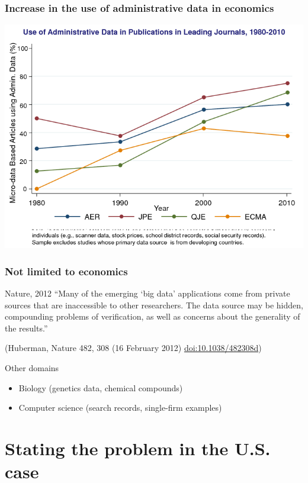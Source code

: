 \begin{frame}
\frametitle{Increase in the use of administrative data in economics}
%
\includegraphics[width=0.7\paperwidth]{ChettySlide2}
\end{frame}

\begin{frame}
\frametitle{Not limited to economics}
\begin{block}{Nature, 2012}
``Many of the emerging `big data' applications come from private sources that are inaccessible to other researchers. The data source may be hidden, compounding problems of verification, as well as concerns about the generality of the results.''\\
\end{block}
{\tiny (Huberman, Nature 482, 308 (16 February 2012) \href{http://dx.doi.org/10.1038/482308d}{doi:10.1038/482308d})}
\begin{block}{Other domains}
\begin{itemize}
\item Biology (genetics data, chemical compounds)
\item Computer science (search records, single-firm examples)
\end{itemize}
\end{block}
\end{frame}

\section[Problem]{Stating the problem in the U.S. case}
\frame{\tableofcontents[currentsection]}

